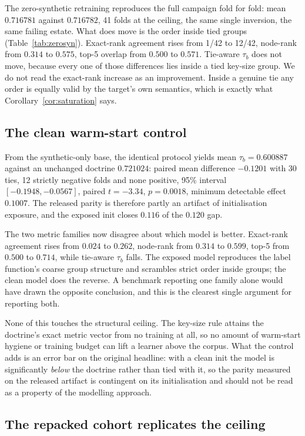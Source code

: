 \documentclass[journal,10pt]{IEEEtran}
\newcommand{\tb}{\tau_b}
\begin{document}
The zero-synthetic retraining reproduces the full campaign fold for fold: mean $0.716781$ against
$0.716782$, 41 folds at the ceiling, the same single inversion, the same failing estate. What does
move is the order inside tied groups (Table~\ref{tab:zerosyn}). Exact-rank agreement rises from 1/42
to 12/42, node-rank from $0.314$ to $0.575$, top-5 overlap from $0.500$ to $0.571$. Tie-aware $\tb$
does not move, because every one of those differences lies inside a tied key-size group. We do not
read the exact-rank increase as an improvement. Inside a genuine tie any order is equally valid by
the target's own semantics, which is exactly what Corollary~\ref{cor:saturation} says.

\subsection{The clean warm-start control}

From the synthetic-only base, the identical protocol yields mean $\tb=0.600887$ against an
unchanged doctrine $0.721024$: paired mean difference $-0.1201$ with 30 ties, 12 strictly negative
folds and none positive, 95\% interval $[-0.1948,-0.0567]$, paired $t=-3.34$, $p=0.0018$, minimum
detectable effect $0.1007$. The released parity is therefore partly an artifact of initialisation
exposure, and the exposed init closes $0.116$ of the $0.120$ gap.

The two metric families now disagree about which model is better. Exact-rank agreement rises from
$0.024$ to $0.262$, node-rank from $0.314$ to $0.599$, top-5 from $0.500$ to $0.714$, while
tie-aware $\tb$ falls. The exposed model reproduces the label function's coarse group structure and
scrambles strict order inside groups; the clean model does the reverse. A benchmark reporting one
family alone would have drawn the opposite conclusion, and this is the clearest single argument for
reporting both.

None of this touches the structural ceiling. The key-size rule attains the doctrine's exact metric
vector from no training at all, so no amount of warm-start hygiene or training budget can lift a
learner above the corpus. What the control adds is an error bar on the original headline: with a
clean init the model is significantly \emph{below} the doctrine rather than tied with it, so the
parity measured on the released artifact is contingent on its initialisation and should not be read
as a property of the modelling approach.

\subsection{The repacked cohort replicates the ceiling}
\end{document}
